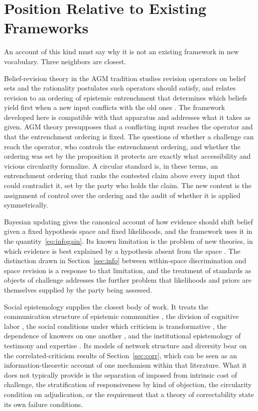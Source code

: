 \documentclass[11pt]{article}
\theoremstyle{remark}
\begin{document}
\section{Position Relative to Existing Frameworks}
\label{sec:position}

An account of this kind must say why it is not an existing framework in new vocabulary. Three neighbors are closest.

Belief-revision theory in the AGM tradition \cite{agm1985} studies revision operators on belief sets and the rationality postulates such operators should satisfy, and relates revision to an ordering of epistemic entrenchment that determines which beliefs yield first when a new input conflicts with the old ones \cite{gardenfors1988}. The framework developed here is compatible with that apparatus and addresses what it takes as given. AGM theory presupposes that a conflicting input reaches the operator and that the entrenchment ordering is fixed. The questions of whether a challenge can reach the operator, who controls the entrenchment ordering, and whether the ordering was set by the proposition it protects are exactly what accessibility and vicious circularity formalize. A circular standard is, in these terms, an entrenchment ordering that ranks the contested claim above every input that could contradict it, set by the party who holds the claim. The new content is the assignment of control over the ordering and the audit of whether it is applied symmetrically.

Bayesian updating gives the canonical account of how evidence should shift belief given a fixed hypothesis space and fixed likelihoods, and the framework uses it in the quantity~\eqref{eq:infogain}. Its known limitation is the problem of new theories, in which evidence is best explained by a hypothesis absent from the space \cite{glymour1980}. The distinction drawn in Section~\ref{sec:info} between within-space discrimination and space revision is a response to that limitation, and the treatment of standards as objects of challenge addresses the further problem that likelihoods and priors are themselves supplied by the party being assessed.

Social epistemology supplies the closest body of work. It treats the communication structure of epistemic communities \cite{zollman2007}, the division of cognitive labor \cite{kitcher1990,kitcher1993}, the social conditions under which criticism is transformative \cite{longino1990}, the dependence of knowers on one another \cite{hardwig1985}, and the institutional epistemology of testimony and expertise \cite{goldman1999}. Its models of network structure and diversity bear on the correlated-criticism results of Section~\ref{sec:corr}, which can be seen as an information-theoretic account of one mechanism within that literature. What it does not typically provide is the separation of imposed from intrinsic cost of challenge, the stratification of responsiveness by kind of objection, the circularity condition on adjudication, or the requirement that a theory of correctability state its own failure conditions.
\end{document}
